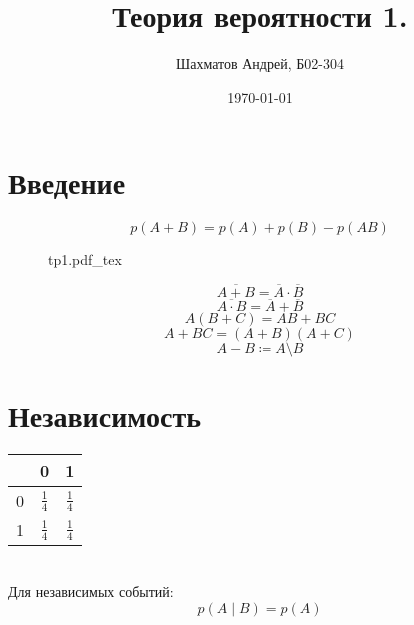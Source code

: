 \documentclass[12pt]{article}
\title{Теория вероятности 1.}
\author{Шахматов Андрей, Б02-304}
\date{\today}
\newcommand{\incfig}[1]{
    {#1.pdf_tex}
}
\begin{document}
\maketitle
\tableofcontents

\section{Введение}
\[
    p(A+B) = p(A) + p(B) - p(AB)
\]
\begin{figure}[H]
    \centering
    \def\svgwidth{0.4\columnwidth}
    \incfig{tp1}
    \label{fig:tp1}
\end{figure}
\[ 
    \overline{A + B} = \overline{A}\cdot\overline{B}
\]
\[
    \overline{A \cdot B} = \overline{A} + \overline{B}   
\]
\[
    A(B + C) = A B + B C
\]
\[
    A + BC = (A + B)(A + C)
\]
\[
    A - B \coloneqq A \setminus B
\]
\section{Независимость}
\begin{table}[H]
    \centering
    \begin{tabular}{c|c|c}
             & 0 & 1  \\
             \hline
             0 & \(\frac{1}{4}\)  & \(\frac{1}{4}\)   \\
             \hline
             1 & \(\frac{1}{4}\)  & \(\frac{1}{4}\)  \\
    \end{tabular}
    \label{tab:1}
\end{table}
\\Для независимых событий:
\[
    p(A \mid  B) = p(A)
\]
\end{document}
